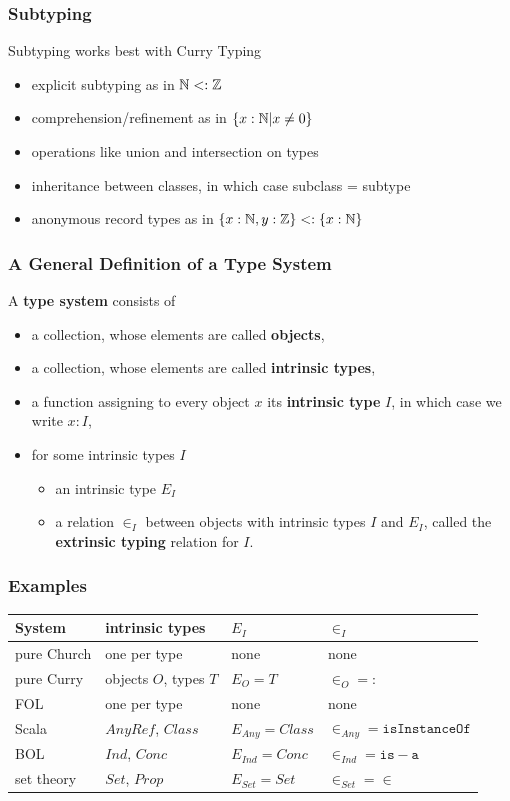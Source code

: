 \documentclass{beamer}
\begin{document}
\begin{frame}\frametitle{Subtyping}
Subtyping works best with Curry Typing
\begin{itemize}
 \item explicit subtyping as in $\mathbb{N}<:\mathbb{Z}$
 \item comprehension/refinement as in $\{x:\mathbb{N}|x\neq 0\}$
 \item operations like union and intersection on types
 \item inheritance between classes, in which case subclass = subtype
 \item anonymous record types as in $\{x:\mathbb{N},y:\mathbb{Z}\}<:\{x:\mathbb{N}\}$
\end{itemize}
\end{frame}

\begin{frame}\frametitle{A General Definition of a Type System}
A \textbf{type system} consists of
\begin{itemize}
 \item a collection, whose elements are called \textbf{objects},
 \item a collection, whose elements are called \textbf{intrinsic types},
 \item a function assigning to every object $x$ its \textbf{intrinsic type} $I$, in which case we write $x:I$,
 \item for some intrinsic types $I$
  \begin{itemize}
   \item an intrinsic type $E_I$
   \item a relation $\in_I$ between objects with intrinsic types $I$ and $E_I$, called the \textbf{extrinsic typing} relation for $I$.
  \end{itemize}
\end{itemize}
\end{frame}

\begin{frame}\frametitle{Examples}
\begin{center}
\begin{tabular}{l|lll}
System & intrinsic types & $E_I$ & $\in_I$ \\
\hline
pure Church & one per type & none & none \\
pure Curry & objects $O$, types $T$ & $E_O=T$ & $\in_O=:$ \\
FOL & one per type & none & none \\
Scala & $AnyRef$, $Class$ & $E_{Any}=Class$ & $\in_{Any}=\mathtt{isInstanceOf}$\\ 
BOL & $Ind$, $Conc$ & $E_{Ind}=Conc$ & $\in_{Ind}=\mathtt{is-a}$\\
set theory & $Set$, $Prop$ & $E_{Set}=Set$ & $\in_{Set}=\in$ \\
\end{tabular}
\end{center}
\end{frame}
\end{document}

